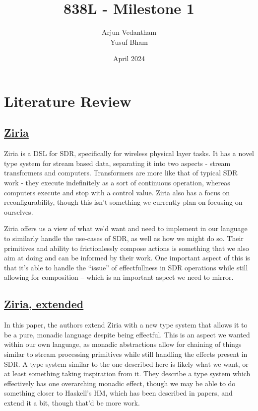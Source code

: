 \documentclass{article}
\title{838L - Milestone 1}
\author{Arjun Vedantham \\ Yusuf Bham}
\date{April 2024}
\begin{document}
\maketitle

\section{Literature Review}
\subsection{\href{https://www.microsoft.com/en-us/research/wp-content/uploads/2016/02/ASPLOS-camera.pdf}{Ziria}}
Ziria is a DSL for SDR, specifically for wireless physical layer tasks. It has
a novel type system for stream based data, separating it into two aspects -
stream transformers and computers. Transformers are more like that of typical
SDR work - they execute indefinitely as a sort of continuous operation, whereas
computers execute and stop with a control value. Ziria also has a focus on reconfigurability,
though this isn't something we currently plan on focusing on ourselves.

Ziria offers us a view of what we'd want and need to implement in our language
to similarly handle the use-cases of SDR, as well as how we might do so. Their
primitives and ability to frictionlessly compose actions is something that we
also aim at doing and can be informed by their work. One important aspect of
this is that it's able to handle the ``issue'' of effectfullness in SDR operations
while still allowing for composition -- which is an important aspect we need to mirror.

\subsection{\href{https://link.springer.com/chapter/10.1007/978-3-319-51676-9_12}{Ziria, extended}}
In this paper, the authors extend Ziria with a new type system that allows
it to be a pure, monadic language despite being effectful. This is an aspect
we wanted within our own language, as monadic abstractions allow for chaining
of things similar to stream processing primitives while still handling the effects
present in SDR. A type system similar to the one described here is likely what we want,
or at least something taking inspiration from it. They describe a type system which
effectively has one overarching monadic effect, though we may be able to do something
closer to Haskell's HM, which has been described in papers, and extend it a bit, though
that'd be more work. 
\end{document}

